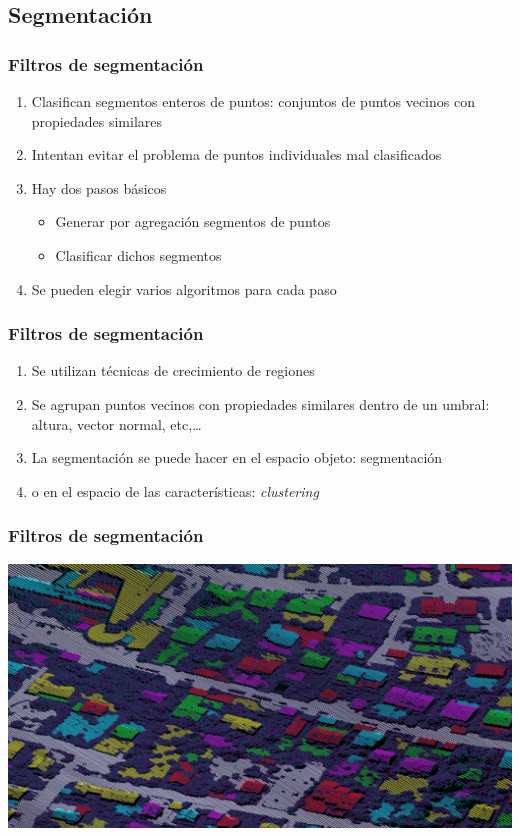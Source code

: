 \subsection{Segmentación}
\begin{frame}
  \frametitle{Filtros de segmentación}
  \begin{enumerate}
    \item Clasifican \alert{segmentos} enteros de puntos: conjuntos de puntos
      vecinos con propiedades similares
    \item Intentan evitar el problema de puntos individuales mal clasificados
    \item Hay dos pasos básicos
      \begin{itemize}
        \item Generar por agregación segmentos de puntos
        \item Clasificar dichos segmentos
      \end{itemize}
    \item Se pueden elegir varios algoritmos para cada paso
  \end{enumerate}
\end{frame}
\begin{frame}
  \frametitle{Filtros de segmentación}
  \begin{enumerate}
    \item<1-> Se utilizan técnicas de \alert{crecimiento de regiones}
    \item<1-> Se agrupan puntos vecinos con propiedades similares dentro de un
      umbral: altura, vector normal, etc,\ldots
    \item<2-> La segmentación se puede hacer en el espacio objeto:
      \alert{segmentación}
    \item<3-> o en el espacio de las características: \alert{\emph{clustering}}
  \end{enumerate}
\end{frame}
\begin{frame}
  \frametitle{Filtros de segmentación}
  \begin{center}
    \includegraphics[height=0.70\textheight]{images/clustering}
  \end{center}
\end{frame}
